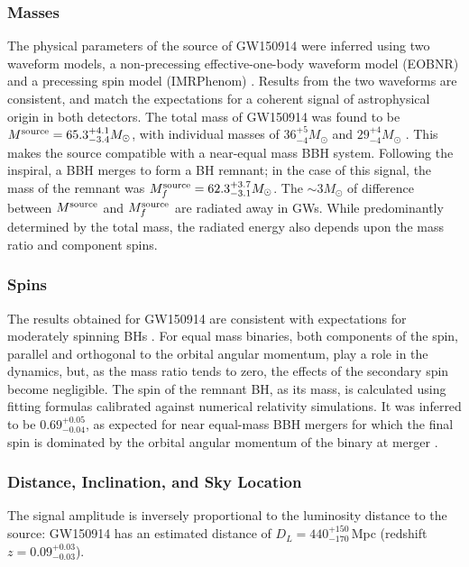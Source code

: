 \documentclass[binding=0.6cm, LaM]{sapthesis}
\begin{document}
\subsubsection{Masses}
	The physical parameters of the source of GW150914 were inferred using two waveform models, 
	a non-precessing effective-one-body waveform model (EOBNR) \cite{103, 104} 
	and a precessing spin model (IMRPhenom) \cite{105, 106, 107}. 
	Results from the two waveforms are consistent, and match the expectations 
	for a coherent signal of astrophysical origin in both detectors. 
	The total mass of GW150914 was found to be $M^{\rm source} = 65.3^{+4.1}_{-3.4}M_\odot$, 
	with individual masses of $36^{+5}_{-4}M_\odot$ and $29^{+4}_{-4}M_\odot$ \cite{21,41,51}.  
	This makes the source compatible with a near-equal mass BBH system.
	Following the inspiral, a BBH merges to form a BH remnant; in the case of this signal, 
	the mass of the remnant was $M^{\rm source}_f = 62.3^{+3.7}_{-3.1}M_\odot$.
	The $\sim 3M_\odot$ of difference between $M^{\rm source}$ and $M^{\rm source}_f$ are radiated away in GWs.  
	While predominantly determined by the total mass, 
	the radiated energy also depends upon the mass ratio and component spins.

\subsubsection{Spins}
	The results obtained for GW150914 are consistent with expectations for moderately spinning BHs \cite{101, 102}. 
	For equal mass binaries, both components of the spin, 
	parallel and orthogonal to the orbital angular momentum, 
	play a role in the dynamics, but, as the mass ratio tends to zero, 
	the effects of the secondary spin become negligible.
	The spin of the remnant BH, as its mass, is calculated using fitting formulas 
	calibrated against numerical relativity simulations.  
	It was inferred to be $0.69^{+0.05}_{-0.04}$, as expected for near equal-mass BBH mergers 
	for which the final spin is dominated by the orbital angular momentum of the binary at merger \cite{99, 100}.

\subsubsection{Distance, Inclination, and Sky Location}
	The signal amplitude is inversely proportional to the luminosity distance to the source: 
	GW150914 has an estimated distance of $D_L = 440^{+150}_{-170}\,$Mpc (redshift $z=0.09^{+0.03}_{-0.03}$). 
\end{document}
